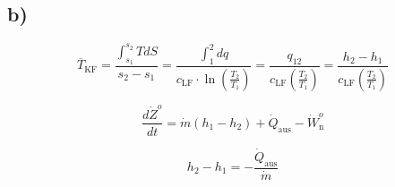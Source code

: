 

\subsection*{b)}

\[
\overline{T}_{\text{KF}} = \frac{\int_{s_1}^{s_2} T dS}{s_2 - s_1} = \frac{\int_{1}^{2} dq}{c_{\text{LF}} \cdot \ln \left( \frac{T_2}{T_1} \right)} = \frac{q_{12}}{c_{\text{LF}} \left( \frac{T_2}{T_1} \right)} = \frac{h_2 - h_1}{c_{\text{LF}} \left( \frac{T_2}{T_1} \right)}
\]

\[
\frac{d\dot{Z}^o}{dt} = \dot{m} (h_1 - h_2) + \dot{Q}_{\text{aus}} - \dot{W}^o_{\text{n}}
\]

\[
h_2 - h_1 = - \frac{\dot{Q}_{\text{aus}}}{\dot{m}}
\]